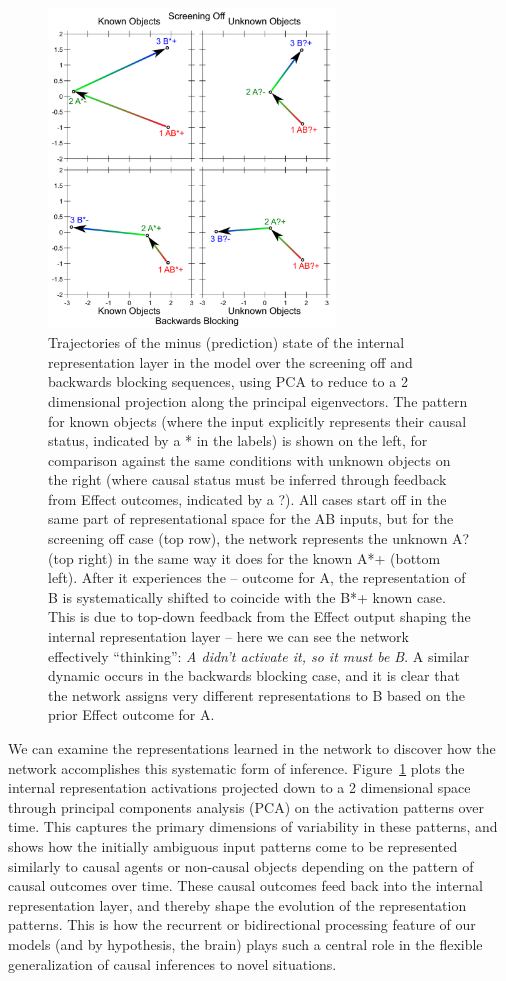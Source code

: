 \documentclass[11pt,twoside]{article}
\newif\myifpdf
\begin{document}
\begin{figure}
\centering\includegraphics[width=3in]{figs/fig_blicket_pcatraj}
  \caption{\small Trajectories of the minus (prediction) state of the internal representation layer in the model over the screening off and backwards blocking sequences, using PCA to reduce to a 2 dimensional projection along the principal eigenvectors.  The pattern for known objects (where the input explicitly represents their causal status, indicated by a * in the labels) is shown on the left, for comparison against the same conditions with unknown objects on the right (where causal status must be inferred through feedback from Effect outcomes, indicated by a ?).  All cases start off in the same part of representational space for the AB inputs, but for the screening off case (top row), the network represents the unknown A? (top right) in the same way it does for the known A*+ (bottom left).  After it experiences the -- outcome for A, the representation of B is systematically shifted to coincide with the B*+ known case.  This is due to top-down feedback from the Effect output shaping the internal representation layer -- here we can see the network effectively ``thinking'': {\em A didn't activate it, so it must be B}.  A similar dynamic occurs in the backwards blocking case, and it is clear that the network assigns very different representations to B based on the prior Effect outcome for A.}
  \label{fig.pcatraj}
\end{figure}

We can examine the representations learned in the network to discover how the network accomplishes this systematic form of inference.  Figure~\ref{fig.pcatraj} plots the internal representation activations projected down to a 2 dimensional space through principal components analysis (PCA) on the activation patterns over time.  This captures the primary dimensions of variability in these patterns, and shows how the initially ambiguous input patterns come to be represented similarly to causal agents or non-causal objects depending on the pattern of causal outcomes over time.  These causal outcomes feed back into the internal representation layer, and thereby shape the evolution of the representation patterns.  This is how the recurrent or bidirectional processing feature of our models (and by hypothesis, the brain) plays such a central role in the flexible generalization of causal inferences to novel situations.
\end{document}
